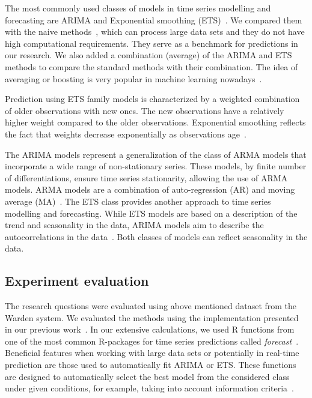 \documentclass[runningheads]{llncs}
\begin{document}
The most commonly used classes of models in time series modelling and forecasting are ARIMA and Exponential smoothing (ETS)~\cite{hyndman2018forecasting}. We compared them with the naive methods~\cite{brockwell2016introduction,box2015time}, which can process large data sets and they do not have high computational requirements. They serve as a benchmark for predictions in our research. We also added a combination (average) of the ARIMA and ETS methods to compare the standard methods with their combination. The idea  of averaging or boosting is very popular in machine learning nowadays~\cite{Husak2018survey}. 

Prediction using ETS family models is characterized by a weighted combination of older observations with new ones. The new observations have a relatively higher weight compared to the older observations. Exponential smoothing reflects the fact that weights decrease exponentially as observations age~\cite{hyndman2018forecasting,brockwell2016introduction}.

The ARIMA models represent a generalization of the class of ARMA models that incorporate a wide range of non-stationary series. These models, by finite number of differentiations, ensure time series stationarity, allowing the use of ARMA models. ARMA models are a combination of auto-regression (AR) and moving average (MA)~\cite{box2015time}. The ETS class provides another approach to time series modelling and forecasting. While ETS models are based on a description of the trend and seasonality in the data, ARIMA models aim to describe the autocorrelations in the data~\cite{hyndman2018forecasting}. Both classes of models can reflect seasonality in the data. 

% 
% 


\subsection{Experiment evaluation}
The research questions were evaluated using above mentioned dataset from the Warden system. We evaluated the methods using the implementation presented in our previous work~\cite{Sokol2018,new_paper}. In our extensive calculations, we used R functions from one of the most common R-packages for time series predictions called \textit{forecast}~\cite{hyndman2007automatic}. Beneficial features when working with large data sets or potentially in real-time prediction are those used to automatically fit ARIMA or ETS. These functions are designed to automatically select the best model from the considered class under given conditions, for example, taking into account information criteria~\cite{hyndman2007automatic}.
\end{document}
